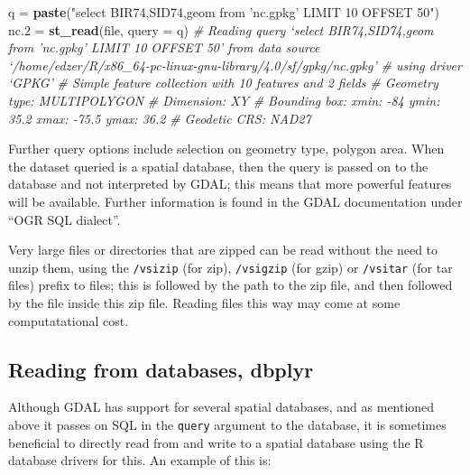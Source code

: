 \documentclass[]{book}
\newenvironment{Shaded}{\begin{snugshade}}{\end{snugshade}}
\newcommand{\CommentTok}[1]{\textcolor[rgb]{0.56,0.35,0.01}{\textit{#1}}}
\newcommand{\DataTypeTok}[1]{\textcolor[rgb]{0.13,0.29,0.53}{#1}}
\newcommand{\FloatTok}[1]{\textcolor[rgb]{0.00,0.00,0.81}{#1}}
\newcommand{\KeywordTok}[1]{\textcolor[rgb]{0.13,0.29,0.53}{\textbf{#1}}}
\newcommand{\NormalTok}[1]{#1}
\newcommand{\StringTok}[1]{\textcolor[rgb]{0.31,0.60,0.02}{#1}}
\begin{document}
\begin{Shaded}
\begin{Highlighting}[]
\NormalTok{q =}\StringTok{ }\KeywordTok{paste}\NormalTok{(}\StringTok{"select BIR74,SID74,geom from 'nc.gpkg' LIMIT 10 OFFSET 50"}\NormalTok{)}
\NormalTok{nc}\FloatTok{.2}\NormalTok{ =}\StringTok{ }\KeywordTok{st_read}\NormalTok{(file, }\DataTypeTok{query =}\NormalTok{ q)}
\CommentTok{# Reading query `select BIR74,SID74,geom from 'nc.gpkg' LIMIT 10 OFFSET 50' from data source `/home/edzer/R/x86_64-pc-linux-gnu-library/4.0/sf/gpkg/nc.gpkg' }
\CommentTok{#   using driver `GPKG'}
\CommentTok{# Simple feature collection with 10 features and 2 fields}
\CommentTok{# Geometry type: MULTIPOLYGON}
\CommentTok{# Dimension:     XY}
\CommentTok{# Bounding box:  xmin: -84 ymin: 35.2 xmax: -75.5 ymax: 36.2}
\CommentTok{# Geodetic CRS:  NAD27}
\end{Highlighting}
\end{Shaded}

Further query options include selection on geometry type, polygon
area. When the dataset queried is a spatial database, then the query
is passed on to the database and not interpreted by GDAL; this means
that more powerful features will be available. Further information
is found in the GDAL documentation under ``OGR SQL dialect''.

Very large files or directories that are zipped can be read
without the need to unzip them, using the \texttt{/vsizip} (for zip),
\texttt{/vsigzip} (for gzip) or \texttt{/vsitar} (for tar files) prefix to files;
this is followed by the path to the zip file, and then followed by
the file inside this zip file. Reading files this way may come at
some computatational cost.

\hypertarget{reading-from-databases-dbplyr}{%
\subsection{Reading from databases, dbplyr}\label{reading-from-databases-dbplyr}}

Although GDAL has support for several spatial databases, and as
mentioned above it passes on SQL in the \texttt{query} argument to the
database, it is sometimes beneficial to directly read from and
write to a spatial database using the R database drivers for this. An
example of this is:
\end{document}

